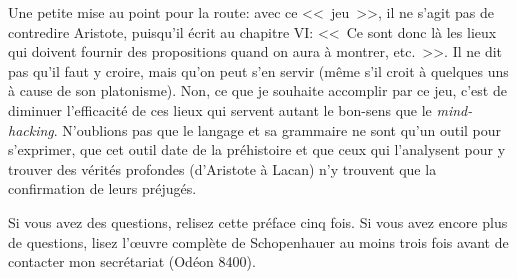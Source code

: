 \bigbreak

Une petite mise au point pour la route: avec ce <<~jeu~>>, il ne s'agit pas de contredire Aristote, puisqu'il écrit au
chapitre VI: <<~Ce sont donc là les lieux qui doivent fournir des propositions quand on aura à montrer, etc.~>>. Il
ne dit pas qu'il faut y croire, mais qu'on peut s'en servir (même s'il croit à quelques uns à cause de son platonisme).
Non, ce que je souhaite accomplir par ce jeu, c'est de diminuer l'efficacité de ces lieux qui servent autant le bon-sens
que le \emph{mind-hacking}. N'oublions pas que le langage et sa grammaire ne sont qu'un outil pour s'exprimer, que cet
outil date de la préhistoire et que ceux qui l'analysent pour y trouver des vérités profondes (d'Aristote à Lacan) n'y
trouvent que la confirmation de leurs préjugés.

\bigbreak

Si vous avez des questions, relisez cette préface cinq fois. Si vous avez encore plus de questions, lisez l’œuvre
complète de Schopenhauer au moins trois fois avant de contacter mon secrétariat (Odéon 8400).


\begin{comment}
En terme d'éthique, les végans sont aux français moyens ce que que les français moyens sont aux cannibales par loisirs.

\bigbreak

Bons de 23 siècles incessants. Retrospective bigoteering. Sophismes involontaires la plupart du temps.

Uniquement dans les chapitres de lieux donc le 6, le 7 etc.

Il ne s'agit pas de contredire Aristote, puisqu'il dit lui-même au chapitre 6: Ce sont donc là les lieux qui doivent fournir
des propositions quand on aura à montrer, etc.

Il s'agit de s’entraîner à contredire les différentes formes de discours rhétoriques.

\end{comment}

